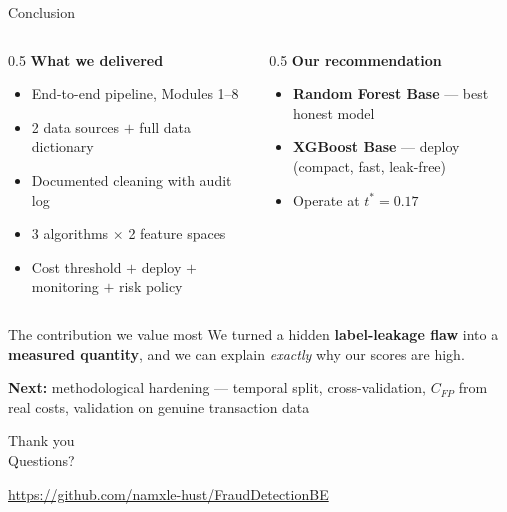 \documentclass[aspectratio=169]{beamer}
\newcommand{\good}[1]{\textcolor{good}{\textbf{#1}}}
\begin{document}
\begin{frame}{Conclusion}
\begin{columns}[T]
\begin{column}{0.5\textwidth}
\textbf{What we delivered}
\begin{itemize}
    \item End-to-end pipeline, Modules 1--8
    \item 2 data sources $+$ full data dictionary
    \item Documented cleaning with audit log
    \item 3 algorithms $\times$ 2 feature spaces
    \item Cost threshold $+$ deploy $+$ monitoring $+$ risk policy
\end{itemize}
\end{column}
\begin{column}{0.5\textwidth}
\textbf{Our recommendation}
\begin{itemize}
    \item \good{Random Forest Base} --- best honest model
    \item \good{XGBoost Base} --- deploy (compact, fast, leak-free)
    \item Operate at \good{$t^{*} = 0.17$}
\end{itemize}
\end{column}
\end{columns}

\vspace{1em}
\begin{block}{The contribution we value most}
We turned a hidden \textbf{label-leakage flaw} into a \textbf{measured quantity},
and we can explain \emph{exactly} why our scores are high.
\end{block}

\vspace{0.5em}
\centering
\textbf{Next:} methodological hardening --- temporal split, cross-validation,
$C_{FP}$ from real costs, validation on genuine transaction data
\end{frame}

\begin{frame}
\centering
\Huge Thank you\\[0.5em]
\large Questions?

\vspace{2em}
\normalsize
\url{https://github.com/namxle-hust/FraudDetectionBE}
\end{frame}
\end{document}
